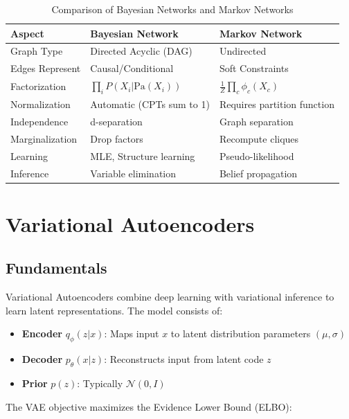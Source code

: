 \documentclass[conference]{IEEEtran}
\begin{document}
\begin{table}[!t]
\renewcommand{\arraystretch}{1.3}
\caption{Comparison of Bayesian Networks and Markov Networks}
\label{tab:pgm_comparison}
\centering
\begin{tabular}{lll}
\hline
\textbf{Aspect} & \textbf{Bayesian Network} & \textbf{Markov Network} \\ \hline
Graph Type & Directed Acyclic (DAG) & Undirected \\
Edges Represent & Causal/Conditional & Soft Constraints \\
Factorization & $\prod_i P(X_i|\text{Pa}(X_i))$ & $\frac{1}{Z}\prod_c \phi_c(X_c)$ \\
Normalization & Automatic (CPTs sum to 1) & Requires partition function \\
Independence & d-separation & Graph separation \\
Marginalization & Drop factors & Recompute cliques \\
Learning & MLE, Structure learning & Pseudo-likelihood \\
Inference & Variable elimination & Belief propagation \\ \hline
\end{tabular}
\end{table}

\section{Variational Autoencoders}

\subsection{Fundamentals}

Variational Autoencoders combine deep learning with variational inference to learn latent representations. The model consists of:

\begin{itemize}
    \item \textbf{Encoder} $q_\phi(z|x)$: Maps input $x$ to latent distribution parameters $(\mu, \sigma)$
    \item \textbf{Decoder} $p_\theta(x|z)$: Reconstructs input from latent code $z$
    \item \textbf{Prior} $p(z)$: Typically $\mathcal{N}(0, I)$
\end{itemize}

The VAE objective maximizes the Evidence Lower Bound (ELBO):
\end{document}
